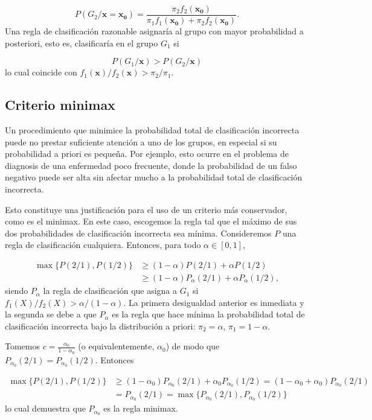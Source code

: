 \documentclass[
  a4paper,
  oneside]{scrbook}
\theoremstyle{definition}
\theoremstyle{definition}
\theoremstyle{definition}
\theoremstyle{definition}
\theoremstyle{remark}
\begin{document}
\[P(G_2/\bm{x}=\bm{x_0})=\frac{\pi_2 f_2(\bm{x_0})}{\pi_1 f_1(\bm{x_0})+\pi_2 f_2(\bm{x_0})}.\]
Una regla de clasificación razonable asignaría al grupo con mayor
probabilidad a posteriori, esto es, clasificaría en el grupo \(G_1\) si

\[P(G_1/\bm{x})>P(G_2/\bm{x})\] lo cual coincide con
\(f_1(\bm{x})/f_2(\bm{x})>\pi_2/\pi_1\).

\subsection{Criterio minimax}\label{criterio-minimax}

Un procedimiento que minimice la probabilidad total de clasificación
incorrecta puede no prestar suficiente atención a uno de los grupos, en
especial si su probabilidad a priori es pequeña. Por ejemplo, esto
ocurre en el problema de diagnosis de una enfermedad poco frecuente,
donde la probabilidad de un falso negativo puede ser alta sin afectar
mucho a la probabilidad total de clasificación incorrecta.

Esto constituye una justificación para el uso de un criterio más
conservador, como es el minimax. En este caso, escogemos la regla tal
que el máximo de sus dos probabilidades de clasificación incorrecta sea
mínima. Consideremos \(P\) una regla de clasificación cualquiera. Entonces, para todo \(\alpha\in[0,1]\),

\[\begin{aligned}\max\{P(2/1),P(1/2)\}&\geq (1-\alpha)P(2/1)+\alpha P(1/2)\\
&\geq (1-\alpha)P_{\alpha}(2/1)+\alpha P_{\alpha}(1/2),
\end{aligned}\]
siendo \(P_{\alpha}\) la regla de clasificación que asigna a \(G_1\) si
\(f_1(X)/f_2(X)>\alpha/(1-\alpha)\). La primera desigualdad anterior es
inmediata y la segunda se debe a que \(P_{\alpha}\) es la regla que hace
mínima la probabilidad total de clasificación incorrecta bajo la
distribución a priori: \(\pi_2=\alpha\), \(\pi_1=1-\alpha\).

Tomemos \(c=\frac{\alpha_0}{1-\alpha_0}\) (o equivalentemente, \(\alpha_0\))
de modo que \(P_{\alpha_0}(2/1)=P_{\alpha_0}(1/2)\). Entonces

\[\begin{aligned}
\max\{P(2/1),P(1/2)\} & \geq  (1-\alpha_0)P_{\alpha_0}(2/1)+\alpha_0 P_{\alpha_0}(1/2)
=(1-\alpha_0+\alpha_0) P_{\alpha_0}(2/1) \\
&=P_{\alpha_0}(2/1)=\max\{P_{\alpha_0}(2/1),P_{\alpha_0}(1/2)\}\end{aligned}\]
lo cual demuestra que \(P_{\alpha_0}\) es la regla minimax.
\end{document}
